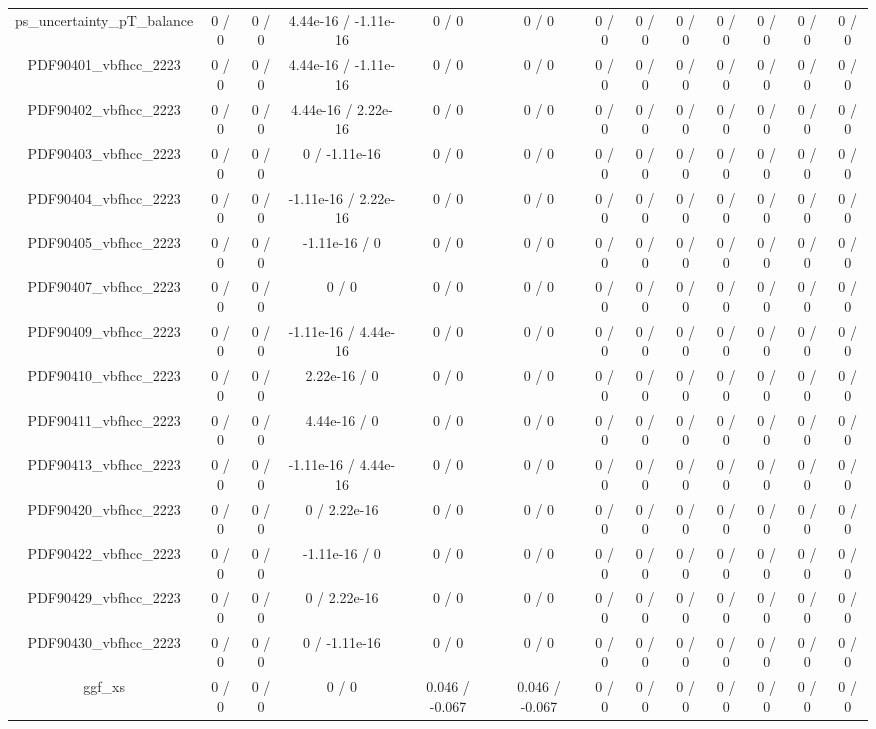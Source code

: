 \documentclass[10pt]{article}
\begin{document}
\begin{table}[htbp]
\begin{center}
\begin{tabular}{|c|c|c|c|c|c|c|c|c|c|c|c|c|}
  ps_uncertainty_pT_balance & 0 / 0 & 0 / 0 & 4.44e-16 / -1.11e-16 & 0 / 0 & 0 / 0 & 0 / 0 & 0 / 0 & 0 / 0 & 0 / 0 & 0 / 0 & 0 / 0 & 0 / 0 \\ 
  PDF90401_vbfhcc_2223 & 0 / 0 & 0 / 0 & 4.44e-16 / -1.11e-16 & 0 / 0 & 0 / 0 & 0 / 0 & 0 / 0 & 0 / 0 & 0 / 0 & 0 / 0 & 0 / 0 & 0 / 0 \\ 
  PDF90402_vbfhcc_2223 & 0 / 0 & 0 / 0 & 4.44e-16 / 2.22e-16 & 0 / 0 & 0 / 0 & 0 / 0 & 0 / 0 & 0 / 0 & 0 / 0 & 0 / 0 & 0 / 0 & 0 / 0 \\ 
  PDF90403_vbfhcc_2223 & 0 / 0 & 0 / 0 & 0 / -1.11e-16 & 0 / 0 & 0 / 0 & 0 / 0 & 0 / 0 & 0 / 0 & 0 / 0 & 0 / 0 & 0 / 0 & 0 / 0 \\ 
  PDF90404_vbfhcc_2223 & 0 / 0 & 0 / 0 & -1.11e-16 / 2.22e-16 & 0 / 0 & 0 / 0 & 0 / 0 & 0 / 0 & 0 / 0 & 0 / 0 & 0 / 0 & 0 / 0 & 0 / 0 \\ 
  PDF90405_vbfhcc_2223 & 0 / 0 & 0 / 0 & -1.11e-16 / 0 & 0 / 0 & 0 / 0 & 0 / 0 & 0 / 0 & 0 / 0 & 0 / 0 & 0 / 0 & 0 / 0 & 0 / 0 \\ 
  PDF90407_vbfhcc_2223 & 0 / 0 & 0 / 0 & 0 / 0 & 0 / 0 & 0 / 0 & 0 / 0 & 0 / 0 & 0 / 0 & 0 / 0 & 0 / 0 & 0 / 0 & 0 / 0 \\ 
  PDF90409_vbfhcc_2223 & 0 / 0 & 0 / 0 & -1.11e-16 / 4.44e-16 & 0 / 0 & 0 / 0 & 0 / 0 & 0 / 0 & 0 / 0 & 0 / 0 & 0 / 0 & 0 / 0 & 0 / 0 \\ 
  PDF90410_vbfhcc_2223 & 0 / 0 & 0 / 0 & 2.22e-16 / 0 & 0 / 0 & 0 / 0 & 0 / 0 & 0 / 0 & 0 / 0 & 0 / 0 & 0 / 0 & 0 / 0 & 0 / 0 \\ 
  PDF90411_vbfhcc_2223 & 0 / 0 & 0 / 0 & 4.44e-16 / 0 & 0 / 0 & 0 / 0 & 0 / 0 & 0 / 0 & 0 / 0 & 0 / 0 & 0 / 0 & 0 / 0 & 0 / 0 \\ 
  PDF90413_vbfhcc_2223 & 0 / 0 & 0 / 0 & -1.11e-16 / 4.44e-16 & 0 / 0 & 0 / 0 & 0 / 0 & 0 / 0 & 0 / 0 & 0 / 0 & 0 / 0 & 0 / 0 & 0 / 0 \\ 
  PDF90420_vbfhcc_2223 & 0 / 0 & 0 / 0 & 0 / 2.22e-16 & 0 / 0 & 0 / 0 & 0 / 0 & 0 / 0 & 0 / 0 & 0 / 0 & 0 / 0 & 0 / 0 & 0 / 0 \\ 
  PDF90422_vbfhcc_2223 & 0 / 0 & 0 / 0 & -1.11e-16 / 0 & 0 / 0 & 0 / 0 & 0 / 0 & 0 / 0 & 0 / 0 & 0 / 0 & 0 / 0 & 0 / 0 & 0 / 0 \\ 
  PDF90429_vbfhcc_2223 & 0 / 0 & 0 / 0 & 0 / 2.22e-16 & 0 / 0 & 0 / 0 & 0 / 0 & 0 / 0 & 0 / 0 & 0 / 0 & 0 / 0 & 0 / 0 & 0 / 0 \\ 
  PDF90430_vbfhcc_2223 & 0 / 0 & 0 / 0 & 0 / -1.11e-16 & 0 / 0 & 0 / 0 & 0 / 0 & 0 / 0 & 0 / 0 & 0 / 0 & 0 / 0 & 0 / 0 & 0 / 0 \\ 
  ggf_xs & 0 / 0 & 0 / 0 & 0 / 0 & 0.046 / -0.067 & 0.046 / -0.067 & 0 / 0 & 0 / 0 & 0 / 0 & 0 / 0 & 0 / 0 & 0 / 0 & 0 / 0 \\ 

\end{tabular}
\end{center}
\end{table}
\end{document}
